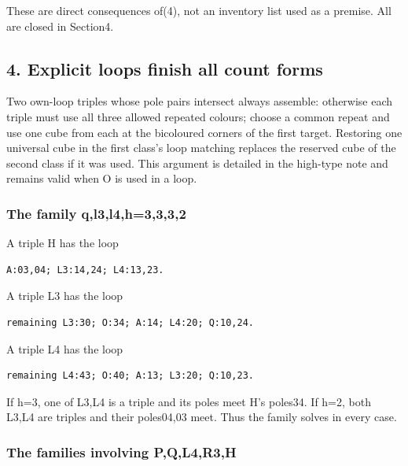 \documentclass[
  10pt,
]{article}
\begin{document}
These are direct consequences of(4), not an inventory list used as a
premise. All are closed in Section4.

\hypertarget{explicit-loops-finish-all-count-forms}{%
\subsection*{4. Explicit loops finish all count
forms}\label{explicit-loops-finish-all-count-forms}}

Two own-loop triples whose pole pairs intersect always assemble:
otherwise each triple must use all three allowed repeated colours;
choose a common repeat and use one cube from each at the bicoloured
corners of the first target. Restoring one universal cube in the first
class's loop matching replaces the reserved cube of the second class if
it was used. This argument is detailed in the high-type note and remains
valid when O is used in a loop.

\hypertarget{the-family-ql3l4h3332}{%
\subsubsection*{The family
q,l3,l4,h=3,3,3,2}\label{the-family-ql3l4h3332}}

A triple H has the loop

\begin{verbatim}
A:03,04; L3:14,24; L4:13,23.
\end{verbatim}

A triple L3 has the loop

\begin{verbatim}
remaining L3:30; O:34; A:14; L4:20; Q:10,24.
\end{verbatim}

A triple L4 has the loop

\begin{verbatim}
remaining L4:43; O:40; A:13; L3:20; Q:10,23.
\end{verbatim}

If h=3, one of L3,L4 is a triple and its poles meet H's poles34. If h=2,
both L3,L4 are triples and their poles04,03 meet. Thus the family solves
in every case.

\hypertarget{the-families-involving-pql4r3h}{%
\subsubsection*{The families involving
P,Q,L4,R3,H}\label{the-families-involving-pql4r3h}}
\end{document}
